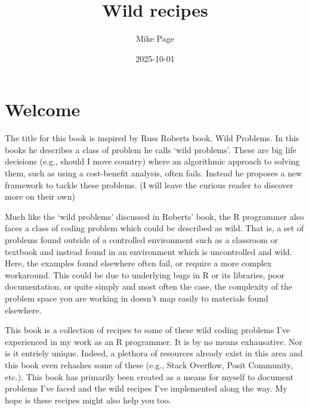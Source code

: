 \documentclass[
  letterpaper,
  DIV=11,
  numbers=noendperiod]{scrreprt}
\title{Wild recipes}
\author{Mike Page}
\date{2025-10-01}
\renewcommand*\contentsname{Table of contents}
\newcommand\contentsname{Table of contents}
\begin{document}
\maketitle
\ifdefined\Shaded\renewenvironment{Shaded}{\begin{tcolorbox}[interior hidden, enhanced, borderline west={3pt}{0pt}{shadecolor}, boxrule=0pt, breakable, sharp corners, frame hidden]}{\end{tcolorbox}}\fi

\renewcommand*\contentsname{Table of contents}
{
\hypersetup{linkcolor=}
\setcounter{tocdepth}{2}
\tableofcontents
}

\hypertarget{welcome}{%
\chapter*{Welcome}\label{welcome}}


The title for this book is inspired by Russ Roberts book, Wild Problems.
In this books he describes a class of problem he calls `wild problems'.
These are big life decisions (e.g., should I move country) where an
algorithmic approach to solving them, such as using a cost-benefit
analysis, often fails. Instead he proposes a new framework to tackle
these problems. (I will leave the curious reader to discover more on
their own)

Much like the `wild problems' discussed in Roberts' book, the R
programmer also faces a class of coding problem which could be described
as wild. That is, a set of problems found outside of a controlled
environment such as a classroom or textbook and instead found in an
environment which is uncontrolled and wild. Here, the examples found
elsewhere often fail, or require a more complex workaround. This could
be due to underlying bugs in R or its libraries, poor documentation, or
quite simply and most often the case, the complexity of the problem
space you are working in doesn't map easily to materials found
elsewhere.

This book is a collection of recipes to some of these wild coding
problems I've experienced in my work as an R programmer. It is by no
means exhausative. Nor is it entriely unique. Indeed, a plethora of
resources already exist in this area and this book even rehashes some of
these (e.g., Stack Overflow, Posit Community, etc.). This book has
primarily been created as a means for myself to document problems I've
faced and the wild recipes I've implemented along the way. My hope is
these recipes might also help you too.
\end{document}
